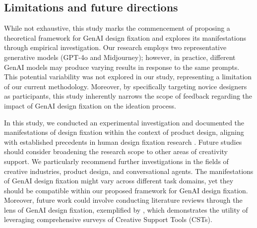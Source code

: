 




\subsection{Limitations and future directions}
While not exhaustive, this study marks the commencement of proposing a theoretical framework for GenAI design fixation and explores its manifestations through empirical investigation. Our research employs two representative generative models (GPT-4o and Midjourney); however, in practice, different GenAI models may produce varying results in response to the same prompts. This potential variability was not explored in our study, representing a limitation of our current methodology. Moreover, by specifically targeting novice designers as participants, this study inherently narrows the scope of feedback regarding the impact of GenAI design fixation on the ideation process. 


In this study, we conducted an experimental investigation and documented the manifestations of design fixation within the context of product design, aligning with established precedents in human design fixation research \cite{crilly2017next}. Future studies should consider broadening the research scope to other areas of creativity support. We particularly recommend further investigations in the fields of creative industries, product design, and conversational agents. The manifestations of GenAI design fixation might vary across different task domains, yet they should be compatible within our proposed framework for GenAI design fixation. Moreover, future work could involve conducting literature reviews through the lens of GenAI design fixation, exemplified by \cite{chakrabarty2024art}, which demonstrates the utility of leveraging comprehensive surveys of Creative Support Tools (CSTs).

